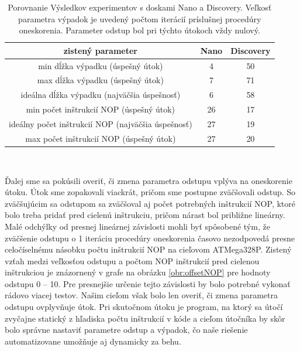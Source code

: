 \begin{table}
    \caption[Porovnanie Výsledkov experimentov]{Porovnanie Výsledkov experimentov s doskami Nano a Discovery. Veľkosť parametra výpadok je uvedený počtom iterácií príslušnej procedúry oneskorenia. Parameter odstup bol pri týchto útokoch vždy nulový.}
    \label{tab:experiments}
    \begin{center}
    \begin{tabular}{|c|c|c|}
        \hline
        zistený parameter & Nano & Discovery \\
        \hline
        min dĺžka výpadku (úspešný útok) & 4 & 50 \\
        \hline
        max dĺžka výpadku (úspešný útok) & 7 & 71 \\
        \hline
        ideálna dĺžka výpadku (najväčšia úspešnosť) & 6 & 58 \\
        \hline
        min počet inštrukcií NOP (úspešný útok) & 26 & 17 \\
        \hline
        ideálny počet inštrukcií NOP (najväčšia úspešnosť) & 27 & 19 \\
        \hline
        max počet inštrukcií NOP (úspešný útok) & 27 & 20 \\
        \hline
    \end{tabular}\\[6pt]
    \end{center}
\end{table}

Ďalej sme sa pokúsili overiť, či zmena parametra odstupu vplýva na oneskorenie útoku. Útok sme zopakovali viackrát, pričom sme postupne zväčšovali odstup. So zväčšujúcim sa odstupom sa zväčšoval aj počet potrebných inštrukcií NOP, ktoré bolo treba pridať pred cielenú inštrukciu, pričom nárast bol približne lineárny. Malé odchýlky od presnej lineárnej závislosti mohli byť spôsobené tým, že zväčšenie odstupu o 1 iteráciu procedúry oneskorenia časovo nezodpovedá presne celočíselnému násobku počtu inštrukcií NOP na cieľovom ATMega328P. Zistený vzťah medzi veľkosťou odstupu a počtom NOP inštrukcií pred cielenou inštrukciou je znázornený v grafe na obrázku \ref{obr:offsetNOP} pre hodnoty odstupu 0 -- 10. Pre presnejšie určenie tejto závislosti by bolo potrebné vykonať rádovo viacej testov. Našim cieľom však bolo len overiť, či zmena parametra odstupu ovplyvňuje útok. Pri skutočnom útoku je program, na ktorý sa útočí zvyčajne statický z hľadiska počtu inštrukcií v kóde a cieľom útočníka by skôr bolo správne nastaviť parametre odstup a výpadok, čo naše riešenie automatizovane umožňuje aj dynamicky za behu.

